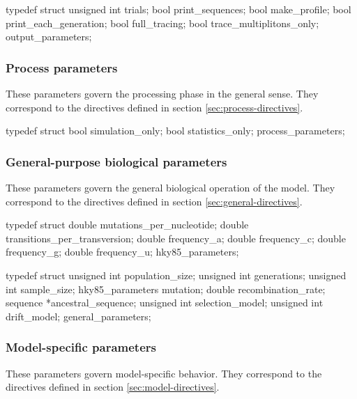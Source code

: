 \documentclass{article}
\begin{document}
\begin{ccode}
typedef struct {
  unsigned int		trials;
  bool			print_sequences;
  bool			make_profile;
  bool			print_each_generation;
  bool			full_tracing;
  bool			trace_multiplitons_only;
} output_parameters;
\end{ccode}

      \subsubsection{Process parameters}
	\label{sec:process-parameters}

	These parameters govern the processing phase in the general sense. They
	correspond to the directives defined in section
	\ref{sec:process-directives}.

\begin{ccode}
typedef struct {
  bool			simulation_only;
  bool			statistics_only;
} process_parameters;
\end{ccode}

      \subsubsection{General-purpose biological parameters}
	\label{sec:general-parameters}

	These parameters govern the general biological operation of the model.
	They correspond to the directives defined in section
	\ref{sec:general-directives}.

\begin{ccode}
typedef struct {
  double		mutations_per_nucleotide;
  double		transitions_per_transversion;
  double		frequency_a;
  double		frequency_c;
  double		frequency_g;
  double		frequency_u;
} hky85_parameters;

typedef struct {
  unsigned int		population_size;
  unsigned int		generations;
  unsigned int		sample_size;
  hky85_parameters	mutation;
  double		recombination_rate;
  sequence		*ancestral_sequence;
  unsigned int		selection_model;
  unsigned int		drift_model;
} general_parameters;
\end{ccode}

      \subsubsection{Model-specific parameters}
	\label{sec:model-parameters}

	These parameters govern model-specific behavior. They correspond to the
	directives defined in section \ref{sec:model-directives}.
\end{document}
